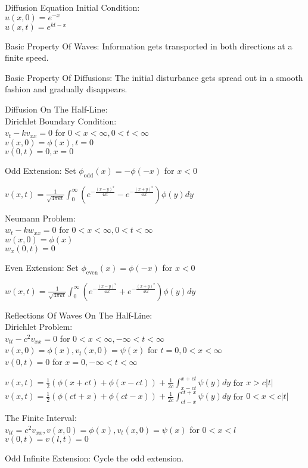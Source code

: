 Diffusion Equation Initial Condition: \\
$u(x,0)=e^{-x}$ \\
$u(x,t)=e^{kt-x}$

Basic Property Of Waves: Information gets transported in both directions at a finite speed.

Basic Property Of Diffusions: The initial disturbance gets spread out in a smooth fashion and gradually disappears.

Diffusion On The Half-Line: \\
Dirichlet Boundary Condition: \\
$v_t-kv_{xx}=0$ for $0<x<\infty,0<t<\infty$ \\
$v(x,0)=\phi (x),t=0$ \\
$v(0,t)=0,x=0$

Odd Extension: Set $\phi_{\text{odd}} (x) = -\phi (-x)$ for $x<0$

$v(x,t)=\frac{1}{\sqrt{4 \pi k t}} \int_0^{\infty} (e^{-\frac{(x-y)^2}{4kt}}-e^{-\frac{(x+y)^2}{4kt}}) \phi (y) dy$

Neumann Problem: \\
$w_t - kw_{xx}=0$ for $ 0<x<\infty, 0<t<\infty$ \\
$w(x,0)=\phi (x)$ \\
$w_x (0,t)=0$

Even Extension: Set $\phi_{\text{even}} (x) = \phi (-x)$ for $x<0$

$w(x,t)=\frac{1}{\sqrt{4 \pi k t}} \int_0^{\infty} (e^{-\frac{(x-y)^2}{4kt}}+e^{-\frac{(x+y)^2}{4kt}}) \phi (y) dy$

Reflections Of Waves On The Half-Line: \\
Dirichlet Problem: \\
$v_{tt}-c^2 v_{xx} = 0$ for $ 0<x<\infty,-\infty<t<\infty$ \\
$v(x,0)=\phi (x), v_t (x,0)=\psi (x)$ for $t=0,0<x<\infty$ \\
$v(0,t)=0$ for $ x=0, -\infty<t<\infty$

$v(x,t)=\frac{1}{2}(\phi (x+ct)+\phi (x-ct))+\frac{1}{2c}\int_{x-ct}^{x+ct} \psi (y) dy$ for $x>c|t|$ \\
$v(x,t)=\frac{1}{2}(\phi (ct+x)+\phi (ct-x))+\frac{1}{2c}\int_{ct-x}^{ct+x} \psi (y) dy$ for $0<x<c|t|$

The Finite Interval: \\
$v_{tt}=c^2 v_{xx}, v(x,0)=\phi (x), v_t (x,0)=\psi (x)$ for $ 0<x<l$ \\
$v(0,t)=v(l,t)=0$

Odd Infinite Extension: Cycle the odd extension.

